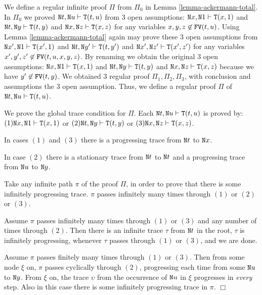 \documentclass[a4paper,12pt]{article}
\newenvironment{proof}[1][Proof]{\begin{trivlist}
\item[\hskip \labelsep {\bfseries #1}]}{\end{trivlist}}
\newcommand{\Nat}               { {\tt N}  }
\newcommand{\FV}              { {\tt FV} }
\newcommand{\Tot}           { {\tt T} }
\begin{document}
\begin{proof}
We define a regular infinite proof $\Pi$ from $\Pi_0$ in Lemma \ref{lemma-ackermann-total}. 
In $\Pi_0$ we proved  $\Nat t, \Nat u \vdash \Tot(t,u)$ from $3$ open assumptions: $\Nat x, 
\Nat 1 \vdash \Tot(x,1)$ and $\Nat t, \Nat y \vdash \Tot(t,y)$ and $\Nat x, \Nat z \vdash \Tot(x,z)
$ for any variables $x,y,z \not \in \FV(t,u)$. Using Lemma \ref{lemma-ackermann-total} again 
may prove these 3 open assumptions from $\Nat x', \Nat 1 \vdash \Tot(x',1)$ and $\Nat t, \Nat y' 
\vdash \Tot(t,y')$ and $\Nat x', \Nat z' \vdash \Tot(x',z')$ for any variables $x',y',z' \not \in 
\FV(t,u,x,y,z)$. By renaming we obtain the original 3 open assumptions: 
$\Nat x, \Nat 1 \vdash \Tot(x,1)$ and $\Nat t, \Nat y 
\vdash \Tot(t,y)$ and $\Nat x, \Nat z \vdash \Tot(x,z)$ because we have $y' \not \in \FV(t,y)$. 
We obtained 3 regular proof $\Pi_1, \Pi_2, \Pi_3$, with conclusion and assumptions the
3 open assumption. Thus, we define a regular proof $\Pi$ of $\Nat t, \Nat u \vdash \Tot(t,u)$.

We prove the global trace condition for $\Pi$. Each $\Nat t, \Nat u \vdash \Tot(t,u)$ is proved by: $(1) \Nat x, \Nat 1 \vdash \Tot(x,1)$ or $(2) \Nat t, \Nat y \vdash \Tot(t,y)$ or $(3)\Nat x, \Nat z \vdash \Tot(x,z)$. 

In cases $(1)$ and $(3)$ there is a progressing trace from $\Nat t$ to $\Nat x$. 

In case $(2)$ there is a stationary trace from $\Nat t$ to $\Nat t$ and a progressing trace from $\Nat u$ to $\Nat y$. 

Take any infinite path $\pi$ of the proof $\Pi$, in order to prove that there is some infinitely progressing trace. $\pi$ passes infinitely many times through $(1)$ or $(2)$ or $(3)$. 

Assume $\pi$ passes infinitely many times through $(1)$ or $(3)$ and any number of times through $(2)$. Then there is an infinite trace $\tau$ from $\Nat t$ in the root, $\tau$ is infinitely progressing, whenever $\tau$ passes through $(1)$ or $(3)$, and we are done. 

Assume $\pi$ passes finitely many times through $(1)$ or $(3)$. Then from some node $\xi$ on, $\pi$ passes cyclically through $(2)$, progressing each time from some $\Nat u$ to $\Nat y$. From $\xi$ on, the trace $\upsilon$ from the occurrence of $\Nat u$ in $\xi$ progresses in \emph{every} step. Also in this case there is some infinitely progressing trace in $\pi$.
$\Box$ 

\end{proof}
\end{document}
